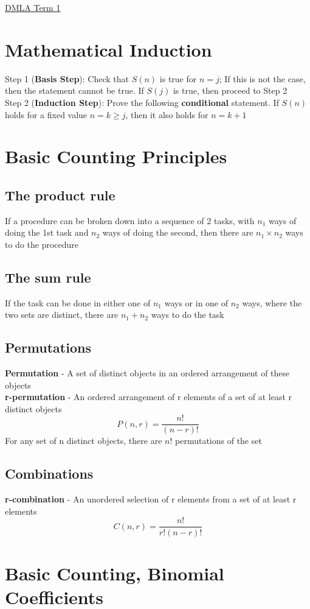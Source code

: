 \documentclass{article}[18pt]
\begin{document}
\begin{center}
\underline{\huge DMLA Term 1}
\end{center}
\section{Mathematical Induction}
Step 1 (\textbf{Basis Step}): Check that $S(n)$ is true for $n=j$; If this is not the case, then the statement cannot be true. If $S(j)$ is true, then proceed to Step 2\\
Step 2 (\textbf{Induction Step}): Prove the following \textbf{conditional} statement. If $S(n)$ holds for a fixed value $n=k\geqslant j$, then it also holds for $n=k+1$
\section{Basic Counting Principles}
\subsection{The product rule}
If a procedure can be broken down into a sequence of 2 tasks, with $n_1$ ways of doing the 1st task and $n_2$ ways of doing the second, then there are $n_1\times n_2$ ways to do the procedure
\subsection{The sum rule}
If the task can be done in either one of $n_1$ ways or in one of $n_2$ ways, where the two sets are distinct, there are $n_1+n_2$ ways to do the task
\subsection{Permutations}
\textbf{Permutation} - A set of distinct objects in an ordered arrangement of these objects\\
\textbf{r-permutation} - An ordered arrangement of r elements of a set of at least r distinct objects
$$P(n,r)=\dfrac{n!}{(n-r)!}$$
For any set of n distinct objects, there are $n!$ permutations of the set
\subsection{Combinations}
\textbf{r-combination} - An unordered selection of r elements from a set of at least r elements
$$C(n,r)=\dfrac{n!}{r!(n-r)!}$$
\section{Basic Counting, Binomial Coefficients}
\end{document}

